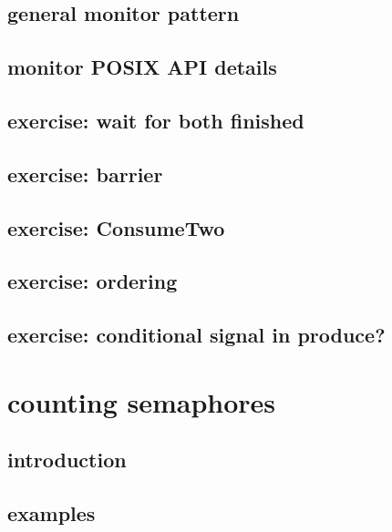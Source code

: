 \subsection{general monitor pattern}


\subsection{monitor POSIX API details}


\subsection{exercise: wait for both finished}


\subsection{exercise: barrier}


\subsection{exercise: ConsumeTwo}


\subsection{exercise: ordering}


\subsection{exercise: conditional signal in produce?}


\section{counting semaphores}

\subsection{introduction}



\subsection{examples}


